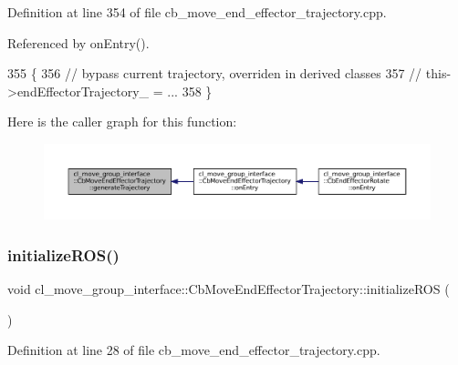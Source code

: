 Definition at line 354 of file cb\+\_\+move\+\_\+end\+\_\+effector\+\_\+trajectory.\+cpp.



Referenced by on\+Entry().


\begin{DoxyCode}
355     \{
356         \textcolor{comment}{// bypass current trajectory, overriden in derived classes}
357         \textcolor{comment}{// this->endEffectorTrajectory\_ = ...}
358     \}
\end{DoxyCode}
Here is the caller graph for this function\+:
\nopagebreak
\begin{figure}[H]
\begin{center}
\leavevmode
\includegraphics[width=350pt]{classcl__move__group__interface_1_1CbMoveEndEffectorTrajectory_aeae938ab66e18ab7d2fb2427bc83647b_icgraph}
\end{center}
\end{figure}
\mbox{\label{classcl__move__group__interface_1_1CbMoveEndEffectorTrajectory_afcee8f3853a5cef8806137a304c8a14b}} 
\subsubsection{\texorpdfstring{initialize\+R\+O\+S()}{initializeROS()}}
{\footnotesize\ttfamily void cl\+\_\+move\+\_\+group\+\_\+interface\+::\+Cb\+Move\+End\+Effector\+Trajectory\+::initialize\+R\+OS (\begin{DoxyParamCaption}{ }\end{DoxyParamCaption})\hspace{0.3cm}{\ttfamily [private]}}



Definition at line 28 of file cb\+\_\+move\+\_\+end\+\_\+effector\+\_\+trajectory.\+cpp.



